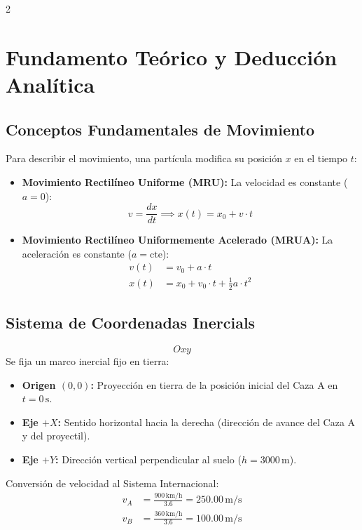 \documentclass[11pt,letterpaper]{article}
\begin{document}
\begin{multicols}{2}
\section{Fundamento Teórico y Deducción Analítica}

\subsection{Conceptos Fundamentales de Movimiento}
Para describir el movimiento, una partícula modifica su posición $x$ en el tiempo $t$:
\begin{itemize}[leftmargin=1.2em]
    \item \textbf{Movimiento Rectilíneo Uniforme (MRU):} La velocidad es constante ($a = 0$):
    \begin{equation}
        v = \frac{dx}{dt} \implies x(t) = x_0 + v \cdot t \label{eq:mru_base}
    \end{equation}
    \item \textbf{Movimiento Rectilíneo Uniformemente Acelerado (MRUA):} La aceleración es constante ($a = \text{cte}$):
    \begin{align}
        v(t) &= v_0 + a \cdot t \label{eq:mrua_v}\\
        x(t) &= x_0 + v_0 \cdot t + \frac{1}{2}a \cdot t^2 \label{eq:mrua_x}
    \end{align}
\end{itemize}

\subsection{Sistema de Coordenadas Inercials}
$$Oxy$$
Se fija un marco inercial fijo en tierra:
\begin{itemize}[leftmargin=1.2em]
    \item \textbf{Origen $(0,0)$:} Proyección en tierra de la posición inicial del Caza A en $t = 0\,\text{s}$.
    \item \textbf{Eje $+X$:} Sentido horizontal hacia la derecha (dirección de avance del Caza A y del proyectil).
    \item \textbf{Eje $+Y$:} Dirección vertical perpendicular al suelo ($h = 3000\,\text{m}$).
\end{itemize}

Conversión de velocidad al Sistema Internacional:
\begin{align}
    v_A &= \frac{900\,\text{km/h}}{3.6} = 250.00\,\text{m/s} \label{eq:conv_va}\\
    v_B &= \frac{360\,\text{km/h}}{3.6} = 100.00\,\text{m/s} \label{eq:conv_vb}
\end{align}


\end{multicols}
\end{document}

